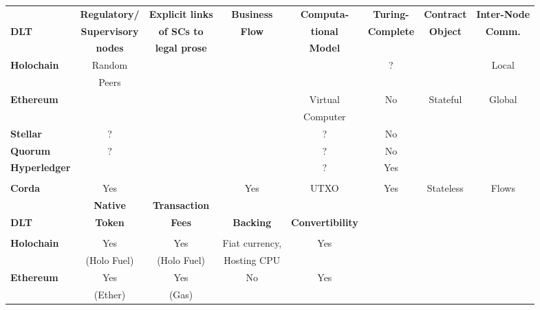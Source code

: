 \begin{table}
\small
\begin{centering}
{\begin{tabular}{| l | c | c | c | c | c | c | c |}
\hline
				& \textbf{Regulatory/} 	& \textbf{Explicit links}	&\textbf{Business}
				& \textbf{Computa-} 		& \textbf{Turing-}		&\textbf{Contract}	& \textbf{Inter-Node}	\\
\textbf{DLT}		& \textbf{Supervisory} 	& \textbf{of SCs to}		&\textbf{Flow} 
				& \textbf{tional} 			& \textbf{Complete}		&\textbf{Object}		& \textbf{Comm.} \\
				& \textbf{nodes} 		& \textbf{legal prose}		&\textbf{} 
				& \textbf{Model} 		& \textbf{}				&\textbf{} 			&\\
\hline
\hline
\textbf{Holochain}	&Random				&			& 		&				&?
				&					&Local \\
				&Peers				&			& 		&				&
				&					& \\
\hline
\textbf{Ethereum}	&					&			&		&Virtual			&No
				&Stateful 				&Global \\
				&					&			&		&Computer		&
				& 					& \\
\hline

\textbf{Stellar}		&?					&			& 		&?				&No
				&					& \\
\hline
\textbf{Quorum} 	&?					&			& 		&?				&No
				&					& \\
\hline
\textbf{Hyperledger}	&					&			& 		&?				&Yes
				&					& \\
 				&					&			& 		&				&
				&					& \\
\hline
\textbf{Corda} 		&Yes					&			&Yes		&UTXO			&Yes	
				&Stateless			&Flows \\
\hline
\hline
\hline
\hline
				& \textbf{Native} 		& \textbf{Transaction}&\textbf{}
				& \textbf{}  			& \textbf{}  		& \textbf{} 		& \\
\textbf{DLT}		& \textbf{Token} 		& \textbf{Fees}		&\textbf{Backing} 
				& \textbf{Convertibility}	& \textbf{} 			& \textbf{} 		& \textbf{} \\
				& \textbf{} 				& \textbf{}			&\textbf{}
				& \textbf{} 				& \textbf{} 			& \textbf{} 		&\\
\hline
\hline
\textbf{Holochain}	&Yes			&Yes			& Fiat currency,
				&Yes			&			&				& \\
				&(Holo Fuel)	&(Holo Fuel)	&Hosting CPU
				& 			&			&				& \\
\hline
\textbf{Ethereum}	&Yes			&Yes			&No 
				&Yes			&			&				& \\
				&(Ether)		&(Gas)		& 
				& 			&			&				& \\
\hline


\end{tabular}}
\end{centering}
\end{table}
